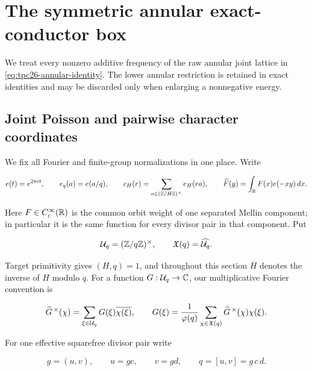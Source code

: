 \section{The symmetric annular exact-conductor box}
\label{sec:tpc26-symmetric-conductor}

We treat every nonzero additive frequency of the raw annular joint
lattice in \eqref{eq:tpc26-annular-identity}.  The lower annular
restriction is retained in exact identities and may be discarded only
when enlarging a nonnegative energy.

\subsection{Joint Poisson and pairwise character coordinates}

We fix all Fourier and finite-group normalizations in one place.  Write

\begin{equation}
 e(t)=e^{2\pi it},
 \qquad
 e_q(a)=e(a/q),
 \qquad
 c_H(r)=\sum_{a\in(\mathbb Z/H\mathbb Z)^\times}e_H(ra),
 \qquad
 \widehat F(y)=\int_{\mathbb R}F(x)e(-xy)\,dx.
 \label{eq:tpc26-Fourier-normalizations}
\end{equation}

Here \(F\in C_c^\infty(\mathbb R)\) is the common orbit weight of one
separated Mellin component; in particular it is the same function for
every divisor pair in that component.  Put

\begin{equation}
 \mathcal U_q=(\mathbb Z/q\mathbb Z)^\times,
 \qquad
 \mathfrak X(q)=\widehat{\mathcal U_q}.
 \label{eq:tpc26-unit-character-groups}
\end{equation}

Target primitivity gives \((H,q)=1\), and throughout this section
\(\overline H\) denotes the inverse of \(H\) modulo \(q\).  For a
function \(G:\mathcal U_q\to\mathbb C\), our multiplicative Fourier convention is

\begin{equation}
 \widehat G^{\,\times}(\chi)
 =\sum_{\xi\in\mathcal U_q}G(\xi)\overline{\chi(\xi)},
 \qquad
 G(\xi)=\frac1{\varphi(q)}
 \sum_{\chi\in\mathfrak X(q)}
 \widehat G^{\,\times}(\chi)\chi(\xi).
 \label{eq:tpc26-multiplicative-Fourier}
\end{equation}

For one effective squarefree divisor pair write

\begin{equation}
 g=(u,v),
 \qquad u=gc,
 \qquad v=gd,
 \qquad q=[u,v]=g\,c\,d.
 \label{eq:tpc26-gcdq}
\end{equation}

